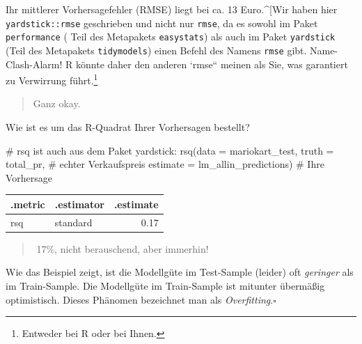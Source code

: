 \documentclass[
  letterpaper,
]{scrbook}
\newenvironment{Shaded}{\begin{snugshade}}{\end{snugshade}}
\newcommand{\AttributeTok}[1]{\textcolor[rgb]{0.40,0.45,0.13}{#1}}
\newcommand{\CommentTok}[1]{\textcolor[rgb]{0.37,0.37,0.37}{#1}}
\newcommand{\FunctionTok}[1]{\textcolor[rgb]{0.28,0.35,0.67}{#1}}
\newcommand{\NormalTok}[1]{\textcolor[rgb]{0.00,0.23,0.31}{#1}}
\theoremstyle{definition}
\theoremstyle{definition}
\theoremstyle{definition}
\theoremstyle{remark}
\begin{document}
Ihr mittlerer Vorhersagefehler (RMSE) liegt bei ca. 13 Euro.\^{}{[}Wir
haben hier \texttt{yardstick::rmse} geschrieben und nicht nur
\texttt{rmse}, da es sowohl im Paket \texttt{performance} ( Teil des
Metapakets \texttt{easystats}) als auch im Paket \texttt{yardstick}
(Teil des Metapakets \texttt{tidymodels}) einen Befehl des Namens
\texttt{rmse} gibt. Name-Clash-Alarm! R könnte daher den anderen `rmse``
meinen als Sie, was garantiert zu Verwirrung führt.\footnote{Entweder
  bei R oder bei Ihnen.}

\begin{quote}
{} Ganz okay.
\end{quote}

Wie ist es um das R-Quadrat Ihrer Vorhersagen bestellt?

\begin{Shaded}
\begin{Highlighting}[]
\CommentTok{\# \textasciigrave{}rsq \textasciigrave{} ist auch aus dem Paket yardstick:}
\FunctionTok{rsq}\NormalTok{(}\AttributeTok{data =}\NormalTok{ mariokart\_test,}
    \AttributeTok{truth =}\NormalTok{ total\_pr,  }\CommentTok{\# echter Verkaufspreis}
    \AttributeTok{estimate =}\NormalTok{ lm\_allin\_predictions)  }\CommentTok{\# Ihre Vorhersage}
\end{Highlighting}
\end{Shaded}

\begin{longtable}[]{@{}llr@{}}
\toprule\noalign{}
.metric & .estimator & .estimate \\
\midrule\noalign{}
\endhead
\bottomrule\noalign{}
\endlastfoot
rsq & standard & 0.17 \\
\end{longtable}

\begin{quote}
{}️ 17\%, nicht berauschend, aber immerhin!
\end{quote}

\begin{tcolorbox}[enhanced jigsaw, left=2mm, toptitle=1mm, toprule=.15mm, rightrule=.15mm, leftrule=.75mm, breakable, colbacktitle=quarto-callout-note-color!10!white, colback=white, coltitle=black, bottomtitle=1mm, opacityback=0, title=\textcolor{quarto-callout-note-color}{\faInfo}\hspace{0.5em}{Modellgüte im Test-Sample meist geringer als im Train-Sample}, colframe=quarto-callout-note-color-frame, arc=.35mm, opacitybacktitle=0.6, bottomrule=.15mm, titlerule=0mm]

Wie das Beispiel zeigt, ist die Modellgüte im Test-Sample (leider) oft
\emph{geringer} als im Train-Sample. Die Modellgüte im Train-Sample ist
mitunter übermäßig optimistisch. Dieses Phänomen bezeichnet man als
\emph{Overfitting}.\(\square\)

\end{tcolorbox}
\end{document}
